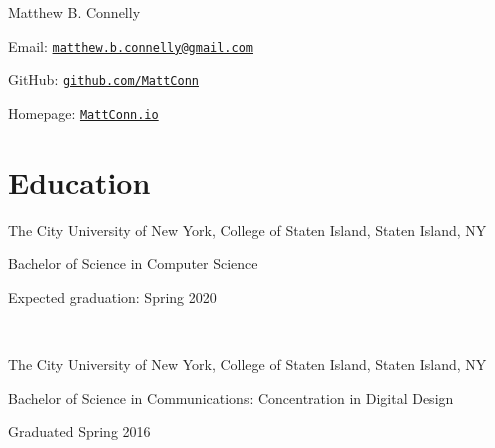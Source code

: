 \documentclass[letterpaper]{article}
\def\name{Matthew B. Connelly}
\renewenvironment{itemize}{
  \begin{list}{}{
    \setlength{\leftmargin}{1.5em}
  }
}{
  \end{list}
}
\begin{document}

\centerline{\huge \name}

\vspace{0.25in}

\begin{itemize}
  \item Email: \href{mailto:matthew.b.connelly@gmail.com}{\tt matthew.b.connelly@gmail.com}

  GitHub: \href{https://github.com/mattconn/}{\tt github.com/MattConn}

  Homepage: \href{http://mattconn.io/}{\tt MattConn.io}
\end{itemize}


\section*{Education}

\begin{itemize}
  \item The City University of New York, College of Staten Island, Staten Island, NY

  Bachelor of Science in Computer Science

  Expected graduation: Spring 2020

  \

  \item The City University of New York, College of Staten Island, Staten Island, NY

  Bachelor of Science in Communications: Concentration in Digital Design

  Graduated Spring 2016
\end{itemize}
\end{document}
